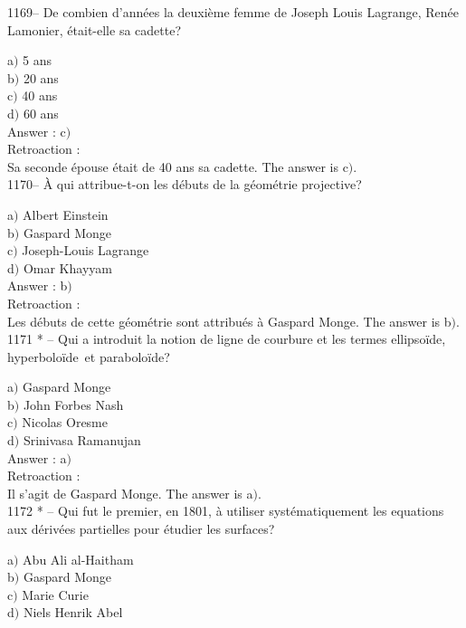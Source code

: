 ﻿\documentclass[letterpaper, 12pt]{article}
\begin{document}
1169-- De combien d'ann\'ees la deuxi\`eme femme de Joseph Louis
Lagrange, Ren\'ee Lamonier, \'etait-elle sa cadette?

a$)$ 5 ans \\
b$)$ 20 ans \\
c$)$ 40 ans \\
d$)$ 60 ans\\

Answer : c$)$\\

Retroaction : \\
Sa seconde \'epouse \'etait de 40 ans sa cadette.
The answer is c$)$.\\

1170-- \`A qui attribue-t-on les d\'ebuts de la g\'eom\'etrie
projective?

a$)$ Albert Einstein \\
b$)$ Gaspard Monge \\
c$)$ Joseph-Louis Lagrange \\
d$)$ Omar Khayyam\\

Answer : b$)$\\

Retroaction : \\
Les d\'ebuts de cette g\'eom\'etrie sont attribu\'es \`a Gaspard
Monge.
The answer is b$)$.\\

1171 * -- Qui a introduit la notion de ligne de courbure et les
termes \og ellipso\"ide\fg , \og hyperbolo\"ide\fg\ et \og
parabolo\"ide\fg ?

a$)$ Gaspard Monge \\
b$)$ John Forbes Nash \\
c$)$ Nicolas Oresme \\
d$)$ Srinivasa Ramanujan\\

Answer : a$)$\\

Retroaction : \\
Il s'agit de Gaspard Monge.
The answer is a$)$.\\

1172 * -- Qui fut le premier, en 1801, \`a utiliser
syst\'ematiquement les equations aux d\'eriv\'ees partielles pour
\'etudier les surfaces?

a$)$ Abu Ali al-Haitham \\
b$)$ Gaspard Monge \\
c$)$ Marie Curie \\
d$)$ Niels Henrik Abel\\
\end{document}

